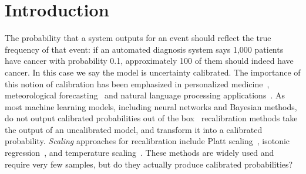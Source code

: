 \section{Introduction}

The probability that a system outputs for an event should reflect the true frequency of that event: if an automated diagnosis system says 1,000 patients have cancer with probability 0.1, approximately 100 of them should indeed have cancer.
In this case we say the model is uncertainty calibrated. The importance of this notion of calibration has been emphasized in personalized medicine~\cite{jiang2012calibrating}, meteorological forecasting~\cite{murphy1973vector, murphy1977reliability, degroot1983forecasters,gneiting2005weather, brocker2009decomposition} and natural language processing applications~\cite{nguyen2015posterior, card2018calibration}.
As most machine learning models, including neural networks and Bayesian methods, do not output calibrated probabilities out of the box~\cite{guo2017calibration, zadrozny2001calibrated, kuleshov2018accurate} recalibration methods take the output of an uncalibrated model, and transform it into a calibrated probability.
\emph{Scaling} approaches for recalibration include Platt scaling~\cite{platt1999probabilistic}, isotonic regression~\cite{zadrozny2002transforming}, and temperature scaling~\cite{guo2017calibration}. These methods are widely used and require very few samples, but do they actually produce calibrated probabilities?

